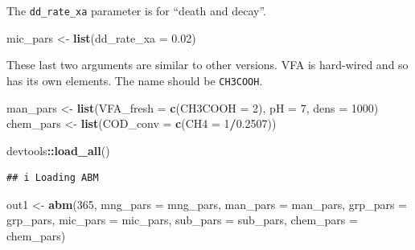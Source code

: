 \documentclass[
]{article}
\newenvironment{Shaded}{\begin{snugshade}}{\end{snugshade}}
\newcommand{\AttributeTok}[1]{\textcolor[rgb]{0.13,0.29,0.53}{#1}}
\newcommand{\DecValTok}[1]{\textcolor[rgb]{0.00,0.00,0.81}{#1}}
\newcommand{\FloatTok}[1]{\textcolor[rgb]{0.00,0.00,0.81}{#1}}
\newcommand{\FunctionTok}[1]{\textcolor[rgb]{0.13,0.29,0.53}{\textbf{#1}}}
\newcommand{\NormalTok}[1]{#1}
\newcommand{\OtherTok}[1]{\textcolor[rgb]{0.56,0.35,0.01}{#1}}
\newcommand{\SpecialCharTok}[1]{\textcolor[rgb]{0.81,0.36,0.00}{\textbf{#1}}}
\begin{document}
The \texttt{dd\_rate\_xa} parameter is for ``death and decay''.

\begin{Shaded}
\begin{Highlighting}[]
\NormalTok{mic\_pars }\OtherTok{\textless{}{-}} \FunctionTok{list}\NormalTok{(}\AttributeTok{dd\_rate\_xa =} \FloatTok{0.02}\NormalTok{)}
\end{Highlighting}
\end{Shaded}

These last two arguments are similar to other versions. VFA is
hard-wired and so has its own elements. The name should be
\texttt{CH3COOH}.

\begin{Shaded}
\begin{Highlighting}[]
\NormalTok{man\_pars }\OtherTok{\textless{}{-}} \FunctionTok{list}\NormalTok{(}\AttributeTok{VFA\_fresh =} \FunctionTok{c}\NormalTok{(}\AttributeTok{CH3COOH =} \DecValTok{2}\NormalTok{), }\AttributeTok{pH =} \DecValTok{7}\NormalTok{, }\AttributeTok{dens =} \DecValTok{1000}\NormalTok{)}
\NormalTok{chem\_pars }\OtherTok{\textless{}{-}} \FunctionTok{list}\NormalTok{(}\AttributeTok{COD\_conv =} \FunctionTok{c}\NormalTok{(}\AttributeTok{CH4 =} \DecValTok{1}\SpecialCharTok{/}\FloatTok{0.2507}\NormalTok{))}
\end{Highlighting}
\end{Shaded}

\begin{Shaded}
\begin{Highlighting}[]
\NormalTok{devtools}\SpecialCharTok{::}\FunctionTok{load\_all}\NormalTok{()}
\end{Highlighting}
\end{Shaded}

\begin{verbatim}
## i Loading ABM
\end{verbatim}

\begin{Shaded}
\begin{Highlighting}[]
\NormalTok{out1 }\OtherTok{\textless{}{-}} \FunctionTok{abm}\NormalTok{(}\DecValTok{365}\NormalTok{,}
            \AttributeTok{mng\_pars =}\NormalTok{ mng\_pars,}
            \AttributeTok{man\_pars =}\NormalTok{ man\_pars,}
            \AttributeTok{grp\_pars =}\NormalTok{ grp\_pars,}
            \AttributeTok{mic\_pars =}\NormalTok{ mic\_pars,}
            \AttributeTok{sub\_pars =}\NormalTok{ sub\_pars,}
            \AttributeTok{chem\_pars =}\NormalTok{ chem\_pars)}
\end{Highlighting}
\end{Shaded}
\end{document}

